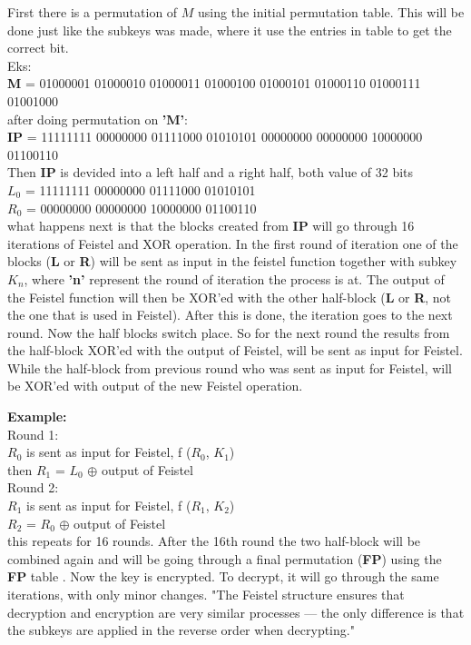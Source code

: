 First there is a permutation of $M$ using the initial permutation \cite{tableWiki} table. This will be done just like the subkeys was made, where it use the entries in table to get the correct bit. \cite{des2} \\
\bigskip
Eks:\\
\textbf{M} = 01000001 01000010 01000011 01000100 01000101 01000110 01000111 01001000\\
\bigskip
after doing permutation on \textbf{'M'}:\\
\textbf{IP} = 11111111 00000000 01111000 01010101 00000000 00000000 10000000 01100110\\
\bigskip
Then \textbf{IP} is devided into a left half and a right half, both value of 32 bits\\
\bigskip
$L_0$ =  11111111 00000000 01111000 01010101\\
$R_0$ = 00000000 00000000 10000000 01100110\\
\bigskip
what happens next is that the blocks created from \textbf{IP} will go through 16 iterations of Feistel and XOR operation.
In the first round of iteration one of the blocks (\textbf{L} or \textbf{R}) will be sent as input in the feistel function together with subkey $K_n$, where \textbf{'n'} represent the round of iteration the process is at. The output of the Feistel function will then be XOR'ed with the other half-block (\textbf{L} or \textbf{R}, not the one that is used in Feistel). After this is done, the iteration goes to the next round. Now the half blocks switch place. So for the next round the results from the half-block XOR'ed with the output of Feistel, will be sent as input for Feistel. While the half-block from previous round who was sent as input for Feistel, will 
be XOR'ed with output of the new Feistel operation. \cite{des1,des2,des3,desWiki,feistelWiki}\\
\bigskip

\textbf{Example:}\\
Round 1:\\
$R_0$ is sent as input for Feistel, f ($R_0$, $K_1$)\\
then $R_1$ =  $L_0$ $\oplus$  output of Feistel\\
\bigskip
Round 2:\\
$R_1$ is sent as input for Feistel, f ($ R_1$, $K_2$)\\
$R_2$ = $R_0$ $\oplus$  output of Feistel\\
\bigskip
this repeats for 16 rounds. After the 16th round the two half-block will be combined again and will be going through a final permutation (\textbf{FP}) using the \textbf{FP} table \cite{tableWiki}. Now the key is encrypted. To decrypt, it will go through the same iterations, with only minor changes. "The Feistel structure ensures that decryption and encryption are very similar processes — the only difference is that the subkeys are applied in the reverse order when decrypting." \cite{desWiki}\\
\bigskip

